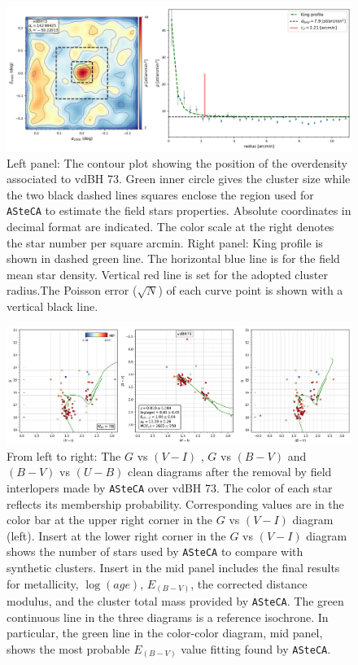 \documentclass[draft]{aa}
\begin{document}
\begin{figure}[ht]
    \centering
    \includegraphics[width=\hsize]{../figs/dmap_vdbh73.png}
    \caption{Left panel: The contour plot showing the position of the
    overdensity associated to vdBH 73. Green inner circle gives
    the cluster size while the two black dashed lines squares enclose the region
    used for \texttt{ASteCA} to estimate the field stars properties. Absolute
    coordinates in decimal format are indicated. The color scale at the right
    denotes the star number per square arcmin. Right panel: King profile is
    shown in dashed green line. The horizontal blue line is for the field
    mean star density. Vertical red line is set for the adopted cluster
    radius.The Poisson error ($\sqrt{N}$) of each curve point is shown with a
    vertical black line.}
    \label{fig4}
\end{figure}

\begin{figure}[ht]
    \centering
    \includegraphics[width=\hsize]{../figs/cmds_vdbh73.png}
    \caption{From left to right: The $G$ vs $(V-I)$ , $G$ vs $(B-V)$ and
    $(B-V)$ vs $(U-B)$ clean diagrams after the removal by field interlopers
    made by \texttt{ASteCA} over vdBH 73. The color of each star reflects
    its membership probability. Corresponding values are in the color bar at
    the upper right corner in the $G$ vs $(V-I)$ diagram (left). Insert at the
    lower right corner in the $G$ vs $(V-I)$ diagram shows the number of stars
    used by \texttt{ASteCA} to compare with synthetic clusters.
    Insert in the mid panel includes the final
    results for metallicity, $\log(age)$, $E_{(B-V)}$, the corrected distance
    modulus, and the cluster total mass provided by \texttt{ASteCA}. The green
    continuous line in the three diagrams is a reference isochrone. In
    particular, the green line in the color-color diagram, mid panel, shows the
    most probable $E_{(B-V)}$ value fitting found by \texttt{ASteCA}.}
    \label{fig5}
\end{figure}
\end{document}
